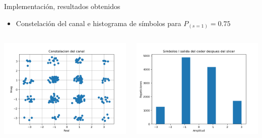 \documentclass[xcolor=table]{beamer}
\begin{document}
\begin{frame}{Implementación, resultados obtenidos}
    \begin{itemize}
        \item Constelación del canal e histograma de símbolos para $P_{(s=1)}=0.75$
    \end{itemize}
    
\begin{columns}
    \begin{column}{0.48\paperwidth}
    \includegraphics[width=\textwidth]{Graficos/Channel_Constelation.png}%
    \end{column}
    \begin{column}{0.48\paperwidth}  
    \includegraphics[width=\textwidth]{Graficos/I_symbols_slicer.png}
    \end{column}
\end{columns}
\end{frame}
\end{document}
